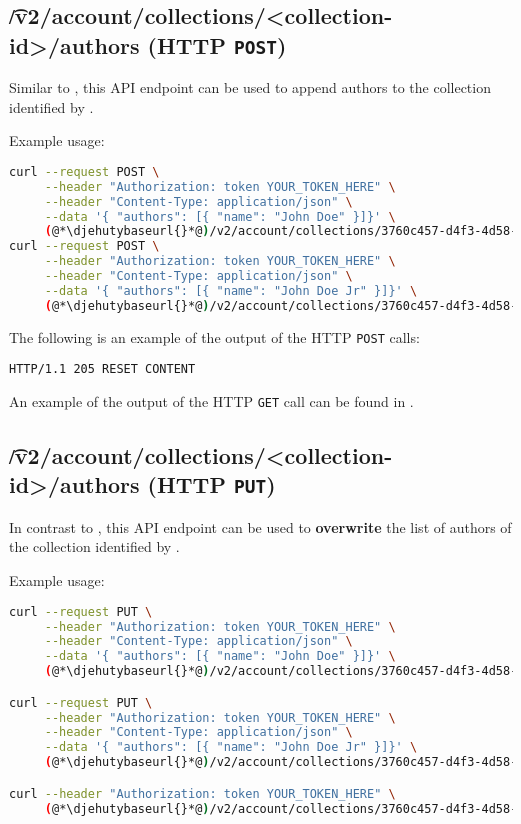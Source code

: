 \subsection{\t{/v2/account/collections/<collection-id>/authors} (HTTP \texttt{POST})}
\label{sec:api-v2-collections-authors-post}

  Similar to , this API endpoint can
  be used to append authors to the collection identified by .

  Example usage:
\begin{lstlisting}[language=bash]
curl --request POST \
     --header "Authorization: token YOUR_TOKEN_HERE" \
     --header "Content-Type: application/json" \
     --data '{ "authors": [{ "name": "John Doe" }]}' \
     (@*\djehutybaseurl{}*@)/v2/account/collections/3760c457-d4f3-4d58-8b94-af089a97a9b4/authors
curl --request POST \
     --header "Authorization: token YOUR_TOKEN_HERE" \
     --header "Content-Type: application/json" \
     --data '{ "authors": [{ "name": "John Doe Jr" }]}' \
     (@*\djehutybaseurl{}*@)/v2/account/collections/3760c457-d4f3-4d58-8b94-af089a97a9b4/authors
\end{lstlisting}

  The following is an example of the output of the HTTP \texttt{POST} calls:
\begin{lstlisting}
HTTP/1.1 205 RESET CONTENT
\end{lstlisting}

  An example of the output of the HTTP \texttt{GET} call can be found in
  .

\subsection{\t{/v2/account/collections/<collection-id>/authors} (HTTP \texttt{PUT})}

  In contrast to , this API endpoint
  can be used to \textbf{overwrite} the list of authors of the collection identified
  by .

  Example usage:
\begin{lstlisting}[language=bash]
curl --request PUT \
     --header "Authorization: token YOUR_TOKEN_HERE" \
     --header "Content-Type: application/json" \
     --data '{ "authors": [{ "name": "John Doe" }]}' \
     (@*\djehutybaseurl{}*@)/v2/account/collections/3760c457-d4f3-4d58-8b94-af089a97a9b4/authors

curl --request PUT \
     --header "Authorization: token YOUR_TOKEN_HERE" \
     --header "Content-Type: application/json" \
     --data '{ "authors": [{ "name": "John Doe Jr" }]}' \
     (@*\djehutybaseurl{}*@)/v2/account/collections/3760c457-d4f3-4d58-8b94-af089a97a9b4/authors

curl --header "Authorization: token YOUR_TOKEN_HERE" \
     (@*\djehutybaseurl{}*@)/v2/account/collections/3760c457-d4f3-4d58-8b94-af089a97a9b4/authors | jq
\end{lstlisting}

